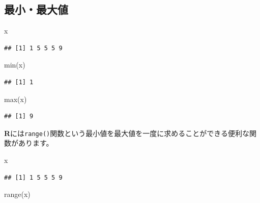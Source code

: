 \documentclass[
  12pt,
]{book}
\newenvironment{Shaded}{\begin{snugshade}}{\end{snugshade}}
\newcommand{\FunctionTok}[1]{\textcolor[rgb]{0.00,0.00,0.00}{#1}}
\newcommand{\NormalTok}[1]{#1}
\begin{document}
\hypertarget{ux6700ux5c0fux6700ux5927ux5024}{%
\subsection{最小・最大値}\label{ux6700ux5c0fux6700ux5927ux5024}}

\begin{Shaded}
\begin{Highlighting}[]
\NormalTok{x}
\end{Highlighting}
\end{Shaded}

\begin{verbatim}
## [1] 1 5 5 5 9
\end{verbatim}

\begin{Shaded}
\begin{Highlighting}[]
\FunctionTok{min}\NormalTok{(x)}
\end{Highlighting}
\end{Shaded}

\begin{verbatim}
## [1] 1
\end{verbatim}

\begin{Shaded}
\begin{Highlighting}[]
\FunctionTok{max}\NormalTok{(x)}
\end{Highlighting}
\end{Shaded}

\begin{verbatim}
## [1] 9
\end{verbatim}

\textbf{R}には\texttt{range()}関数という最小値を最大値を一度に求めることができる便利な関数があります。

\begin{Shaded}
\begin{Highlighting}[]
\NormalTok{x}
\end{Highlighting}
\end{Shaded}

\begin{verbatim}
## [1] 1 5 5 5 9
\end{verbatim}

\begin{Shaded}
\begin{Highlighting}[]
\FunctionTok{range}\NormalTok{(x)}
\end{Highlighting}
\end{Shaded}
\end{document}
